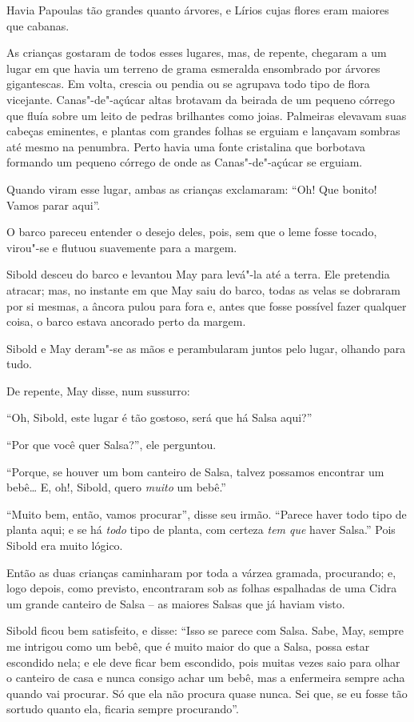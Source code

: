 Havia Papoulas tão grandes quanto árvores, e Lírios cujas flores eram
maiores que cabanas.

As crianças gostaram de todos esses lugares, mas, de repente, chegaram a
um lugar em que havia um terreno de grama esmeralda ensombrado por
árvores gigantescas. Em volta, crescia ou pendia ou se agrupava todo
tipo de flora vicejante. Canas"-de"-açúcar altas brotavam da beirada de um
pequeno córrego que fluía sobre um leito de pedras brilhantes como
joias. Palmeiras elevavam suas cabeças eminentes, e plantas com grandes
folhas se erguiam e lançavam sombras até mesmo na penumbra. Perto havia
uma fonte cristalina que borbotava formando um pequeno córrego de onde
as Canas"-de"-açúcar se erguiam.

Quando viram esse lugar, ambas as crianças exclamaram: ``Oh! Que bonito!
Vamos parar aqui''.

O barco pareceu entender o desejo deles, pois, sem que o leme fosse
tocado, virou"-se e flutuou suavemente para a margem.

Sibold desceu do barco e levantou May para levá"-la até a terra. Ele
pretendia atracar; mas, no instante em que May saiu do barco, todas as
velas se dobraram por si mesmas, a âncora pulou para fora e, antes que
fosse possível fazer qualquer coisa, o barco estava ancorado perto da
margem.

Sibold e May deram"-se as mãos e perambularam juntos pelo lugar, olhando
para tudo.

De repente, May disse, num sussurro:

``Oh, Sibold, este lugar é tão gostoso, será que há Salsa aqui?''

``Por que você quer Salsa?'', ele perguntou.

``Porque, se houver um bom canteiro de Salsa, talvez possamos encontrar
um bebê\ldots{} E, oh!, Sibold, quero \emph{muito} um bebê.''

``Muito bem, então, vamos procurar'', disse seu irmão. ``Parece haver
todo tipo de planta aqui; e se há \emph{todo} tipo de planta, com
certeza \emph{tem que} haver Salsa.'' Pois Sibold era muito lógico.

Então as duas crianças caminharam por toda a várzea gramada,
procurando; e, logo depois, como previsto, encontraram sob as folhas
espalhadas de uma Cidra um grande canteiro de Salsa -- as maiores Salsas
que já haviam visto.

Sibold ficou bem satisfeito, e disse: ``Isso se parece com Salsa. Sabe,
May, sempre me intrigou como um bebê, que é muito maior do que a Salsa,
possa estar escondido nela; e ele deve ficar bem escondido, pois muitas
vezes saio para olhar o canteiro de casa e nunca consigo achar um bebê,
mas a enfermeira sempre acha quando vai procurar. Só que ela não procura
quase nunca. Sei que, se eu fosse tão sortudo quanto ela, ficaria sempre
procurando''.

